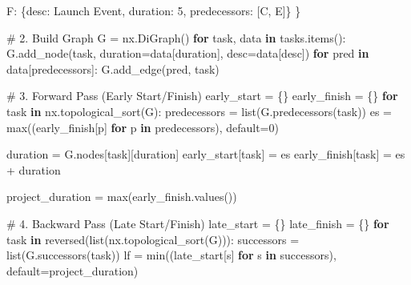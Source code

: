 \documentclass[
  letterpaper,
  DIV=11,
  numbers=noendperiod]{scrreprt}
\newenvironment{Shaded}{\begin{snugshade}}{\end{snugshade}}
\newcommand{\BuiltInTok}[1]{\textcolor[rgb]{0.00,0.23,0.31}{#1}}
\newcommand{\CommentTok}[1]{\textcolor[rgb]{0.37,0.37,0.37}{#1}}
\newcommand{\ControlFlowTok}[1]{\textcolor[rgb]{0.00,0.23,0.31}{\textbf{#1}}}
\newcommand{\DecValTok}[1]{\textcolor[rgb]{0.68,0.00,0.00}{#1}}
\newcommand{\KeywordTok}[1]{\textcolor[rgb]{0.00,0.23,0.31}{\textbf{#1}}}
\newcommand{\NormalTok}[1]{\textcolor[rgb]{0.00,0.23,0.31}{#1}}
\newcommand{\OperatorTok}[1]{\textcolor[rgb]{0.37,0.37,0.37}{#1}}
\newcommand{\StringTok}[1]{\textcolor[rgb]{0.13,0.47,0.30}{#1}}
\begin{document}
\begin{Shaded}
\begin{Highlighting}[]
    \StringTok{\textquotesingle{}F\textquotesingle{}}\NormalTok{: \{}\StringTok{\textquotesingle{}desc\textquotesingle{}}\NormalTok{: }\StringTok{\textquotesingle{}Launch Event\textquotesingle{}}\NormalTok{,    }\StringTok{\textquotesingle{}duration\textquotesingle{}}\NormalTok{: }\DecValTok{5}\NormalTok{,  }\StringTok{\textquotesingle{}predecessors\textquotesingle{}}\NormalTok{: [}\StringTok{\textquotesingle{}C\textquotesingle{}}\NormalTok{, }\StringTok{\textquotesingle{}E\textquotesingle{}}\NormalTok{]\}}
\NormalTok{\}}

\CommentTok{\# 2. Build Graph}
\NormalTok{G }\OperatorTok{=}\NormalTok{ nx.DiGraph()}
\ControlFlowTok{for}\NormalTok{ task, data }\KeywordTok{in}\NormalTok{ tasks.items():}
\NormalTok{    G.add\_node(task, duration}\OperatorTok{=}\NormalTok{data[}\StringTok{\textquotesingle{}duration\textquotesingle{}}\NormalTok{], desc}\OperatorTok{=}\NormalTok{data[}\StringTok{\textquotesingle{}desc\textquotesingle{}}\NormalTok{])}
    \ControlFlowTok{for}\NormalTok{ pred }\KeywordTok{in}\NormalTok{ data[}\StringTok{\textquotesingle{}predecessors\textquotesingle{}}\NormalTok{]:}
\NormalTok{        G.add\_edge(pred, task)}

\CommentTok{\# 3. Forward Pass (Early Start/Finish)}
\NormalTok{early\_start }\OperatorTok{=}\NormalTok{ \{\}}
\NormalTok{early\_finish }\OperatorTok{=}\NormalTok{ \{\}}
\ControlFlowTok{for}\NormalTok{ task }\KeywordTok{in}\NormalTok{ nx.topological\_sort(G):}
\NormalTok{    predecessors }\OperatorTok{=} \BuiltInTok{list}\NormalTok{(G.predecessors(task))}
\NormalTok{    es }\OperatorTok{=} \BuiltInTok{max}\NormalTok{((early\_finish[p] }\ControlFlowTok{for}\NormalTok{ p }\KeywordTok{in}\NormalTok{ predecessors), default}\OperatorTok{=}\DecValTok{0}\NormalTok{)}
    
\NormalTok{    duration }\OperatorTok{=}\NormalTok{ G.nodes[task][}\StringTok{\textquotesingle{}duration\textquotesingle{}}\NormalTok{]}
\NormalTok{    early\_start[task] }\OperatorTok{=}\NormalTok{ es}
\NormalTok{    early\_finish[task] }\OperatorTok{=}\NormalTok{ es }\OperatorTok{+}\NormalTok{ duration}

\NormalTok{project\_duration }\OperatorTok{=} \BuiltInTok{max}\NormalTok{(early\_finish.values())}

\CommentTok{\# 4. Backward Pass (Late Start/Finish)}
\NormalTok{late\_start }\OperatorTok{=}\NormalTok{ \{\}}
\NormalTok{late\_finish }\OperatorTok{=}\NormalTok{ \{\}}
\ControlFlowTok{for}\NormalTok{ task }\KeywordTok{in} \BuiltInTok{reversed}\NormalTok{(}\BuiltInTok{list}\NormalTok{(nx.topological\_sort(G))):}
\NormalTok{    successors }\OperatorTok{=} \BuiltInTok{list}\NormalTok{(G.successors(task))}
\NormalTok{    lf }\OperatorTok{=} \BuiltInTok{min}\NormalTok{((late\_start[s] }\ControlFlowTok{for}\NormalTok{ s }\KeywordTok{in}\NormalTok{ successors), default}\OperatorTok{=}\NormalTok{project\_duration)}
    

\end{Highlighting}
\end{Shaded}
\end{document}
